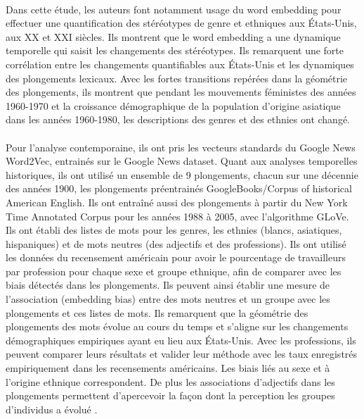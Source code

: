 \documentclass{article}
\begin{document}
\paragraph{}
Dans cette étude, les auteurs font notamment usage du word embedding pour effectuer une quantification des stéréotypes de genre et ethniques aux États-Unis, aux XX et XXI siècles. Ils montrent que le word embedding a une dynamique temporelle qui saisit les changements des stéréotypes. Ils remarquent une forte corrélation entre les changements quantifiables aux États-Unis et les dynamiques des plongements lexicaux. Avec les fortes transitions repérées dans la géométrie des plongements, ils montrent que pendant les mouvements féministes des années 1960-1970 et la croissance démographique de la population d’origine asiatique dans les années 1960-1980, les descriptions des genres et des ethnies ont changé.
\paragraph{}
Pour l’analyse contemporaine, ils ont pris les vecteurs standards du Google News Word2Vec, entrainés sur le Google News dataset. Quant aux analyses temporelles historiques, ils ont utilisé un ensemble de 9 plongements, chacun sur une décennie des années 1900, les plongements préentrainés GoogleBooks/Corpus of historical American English. Ils ont entraîné aussi des plongements à partir du New York Time Annotated Corpus pour les années 1988 à 2005, avec l’algorithme GLoVe. Ils ont établi des listes de mots pour les genres, les ethnies (blancs, asiatiques, hispaniques) et de mots neutres (des adjectifs et des professions). Ils ont utilisé les données du recensement américain pour avoir le pourcentage de travailleurs par profession pour chaque sexe et groupe ethnique, afin de comparer avec les biais détectés dans les plongements. Ils peuvent ainsi établir une mesure de l’association (embedding bias) entre des mots neutres et un groupe avec les plongements et ces listes de mots. Ils remarquent que la géométrie des plongements des mots évolue au cours du temps et s’aligne sur les changements démographiques empiriques ayant eu lieu aux États-Unis. Avec les professions, ils peuvent comparer leurs résultats et valider leur méthode avec les taux enregistrés empiriquement dans les recensements américains. Les biais liés au sexe et à l’origine ethnique correspondent. De plus les associations d’adjectifs dans les plongements permettent d’apercevoir la façon dont la perception les groupes d’individus a évolué \cite{garg2018word}.
\end{document}
